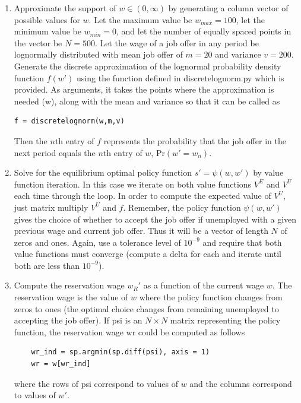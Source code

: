 \begin{problem}
\begin{enumerate}

   \item Approximate the support of $w\in(0,\infty)$ by generating a column vector of possible values for $w$. Let the maximum value be $w_{max} = 100$, let the minimum value be $w_{min} = 0$, and let the number of equally spaced points in the vector be $N = 500$. Let the wage of a job offer in any period be lognormally distributed with mean job offer of $m=20$ and variance $v =200$.  Generate the discrete approximation of the lognormal probability density function $f(w')$ using the function defined in discretelognorm.py which is provided.  As arguments, it takes the points where the approximation is needed (w), along with the mean and variance so that it can be called as

\begin{lstlisting}
f = discretelognorm(w,m,v)
\end{lstlisting}

    Then the $n$th entry of $f$ represents the probability that the job offer in the next period equals the $n$th entry of $w$, $\text{Pr}(w' = w_n)$.

   \item Solve for the equilibrium optimal policy function $s' = \psi(w,w')$ by value function iteration.  In this case we iterate on both value functions $V^E$ and $V^U$ each time through the loop.  In order to compute the expected value of $V^U$, just matrix multiply $V^U$ and $f$. Remember, the policy function $\psi(w,w')$ gives the choice of whether to accept the job offer if unemployed with a given previous wage and current job offer.  Thus it will be a vector of length $N$ of zeros and ones.  Again, use a tolerance level of $10^{-9}$ and require that both value functions must converge (compute a delta for each and iterate until both are less than $10^{-9}$).

   \item Compute the reservation wage $w_R'$ as a function of the current wage $w$.  The reservation wage is the value of $w$ where the policy function changes from zeros to ones (the optimal choice changes from remaining unemployed to accepting the job offer).  If psi is an $N\times N$ matrix representing the policy function, the reservation wage wr could be computed as follows
   \begin{lstlisting}
    wr_ind = sp.argmin(sp.diff(psi), axis = 1)
    wr = w[wr_ind]
   \end{lstlisting}
	where the rows of psi correspond to values of $w$ and the columns correspond to values of $w'$.


\end{enumerate}
\end{problem}

